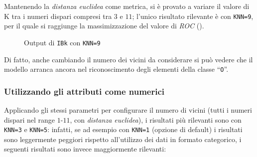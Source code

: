 Mantenendo la \emph{distanza euclidea} come metrica, si è provato a variare il valore di K tra i numeri dispari compresi tra \(3\) e \(11\);
l'unico risultato rilevante è con \texttt{KNN=9}, per il quale si raggiunge la massimizzazione del valore di \emph{ROC} ().



\begin{figure}[H]
  \centering
  \caption{Output di \texttt{IBk} con \texttt{KNN=9}}%
  \label{fig:ibk:9}
\end{figure}

Di fatto, anche cambiando il numero dei vicini da considerare si può vedere che il modello arranca ancora nel riconoscimento degli elementi della classe ``\texttt{O}''.

\subsubsection{Utilizzando gli attributi come numerici}\label{subsub:ibk:numeric}

Applicando gli stessi parametri per configurare il numero di vicini (tutti i numeri dispari nel range \(1\)-\(11\), con \emph{distanza euclidea}), i risultati più rilevanti sono con \texttt{KNN=3} e \texttt{KNN=5}:
infatti, se ad esempio con \texttt{KNN=1} (opzione di default) i risultati sono leggermente peggiori rispetto all'utilizzo dei dati in formato categorico, i seguenti risultati sono invece maggiormente rilevanti:


